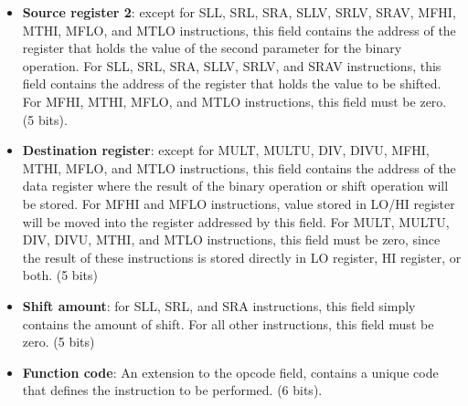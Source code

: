 \documentclass[oneside]{book}
\begin{document}
\begin{itemize}
\begin{itemize}
\item \textbf{Source register 2}: except for SLL, SRL, SRA, SLLV, SRLV,
                                  SRAV, MFHI, MTHI, MFLO, and MTLO
                                  instructions, this field contains
                                  the address of the register that
                                  holds the value of the second parameter
                                  for the binary operation.
                                  For SLL, SRL, SRA, SLLV, SRLV, and
                                  SRAV instructions, this field contains
                                  the address of the register that
                                  holds the value to be shifted.
                                  For MFHI, MTHI, MFLO, and MTLO instructions,
                                  this field must be zero. (5 bits).

\item \textbf{Destination register}: except for MULT, MULTU, DIV, DIVU,
                                     MFHI, MTHI, MFLO, and MTLO instructions,
                                     this field contains the address of the
                                     data register where the result of the
                                     binary operation or shift operation will
                                     be stored.
                                     For MFHI and MFLO instructions, value
                                     stored in LO/HI register will be moved
                                     into the register addressed by this field.
                                     For MULT, MULTU, DIV, DIVU, MTHI, and MTLO
                                     instructions, this field must be zero,
                                     since the result of these instructions
                                     is stored directly in LO register, HI
                                     register, or both. (5 bits)

\item \textbf{Shift amount}: for SLL, SRL, and SRA instructions, this field
                             simply contains the amount of shift. For all
                             other instructions, this field must be zero.
                             (5 bits)

\item \textbf{Function code}: An extension to the opcode field, contains
                              a unique code that defines the instruction
                              to be performed. (6 bits).
\end{itemize}


\end{itemize}
\end{document}
